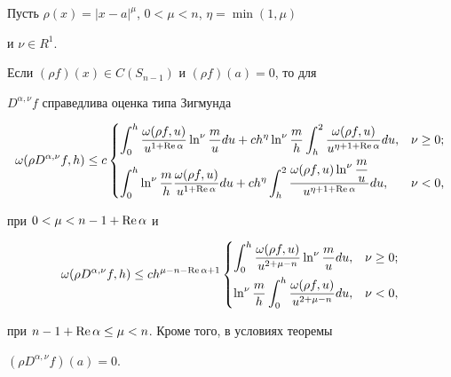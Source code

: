 \begin{thms}


Пусть $\rho(x) = |x-a|^\mu$, $0 < \mu < n$, $\eta = \min(1,\mu)$


и $\nu\in R^1$.


Если $(\rho f)(x) \in C(S_{n-1})$ и $(\rho f)(a) = 0$, то для


$D^{\alpha,\nu}f$ справедлива оценка типа Зигмунда


\begin{equation}


\omega(\rho D^{\alpha,\nu}f,h) \le c


\begin{cases}


\displaystyle\int _0^h


\dfrac{\omega(\rho f,u)}{u^{1+\re \alpha}} \ln^\nu \dfrac{m}{u} du +


c h^{\eta} \ln^\nu \dfrac{m}{h} \displaystyle\int_h^2


\dfrac{\omega(\rho f,u)}{u^{\eta + 1+\re \alpha}} du, & \nu \ge 0;\\[3mm]


\displaystyle\int_0^h


\ln^\nu \dfrac{m}{h}\frac{\omega(\rho f,u)}{u^{1+\re \alpha}} du +


c h^{\eta} \displaystyle\int_h^2


\dfrac{\omega(\rho f,u)\ln^\nu \dfrac{m}{u}}{u^{\eta + 1+\re \alpha}} du,


& \nu <0, 


\end{cases}


\end{equation}


при $0 < \mu < n-1+\operatorname{Re} \alpha$ и


\begin{equation}


\omega(\rho D^{\alpha,\nu}f,h) \le c h^{\mu-n-\re \alpha +1}


\begin{cases}


\displaystyle\int_0^h \dfrac{\omega(\rho f,u)}{u^{2+\mu-n}}


\ln^\nu \dfrac{m}{u} du, & \nu \ge 0;\\[3mm]


\ln^\nu \dfrac{m}{h}\displaystyle\int_0^h


\dfrac{\omega(\rho f,u)}{u^{2+\mu-n}}du, & \nu <0,


\end{cases}


\end{equation}


при $n-1+\operatorname{Re} \alpha \le \mu < n$. Кроме того, в условиях теоремы


$(\rho D^{\alpha,\nu}f)(a) = 0$.


\end{thms}





